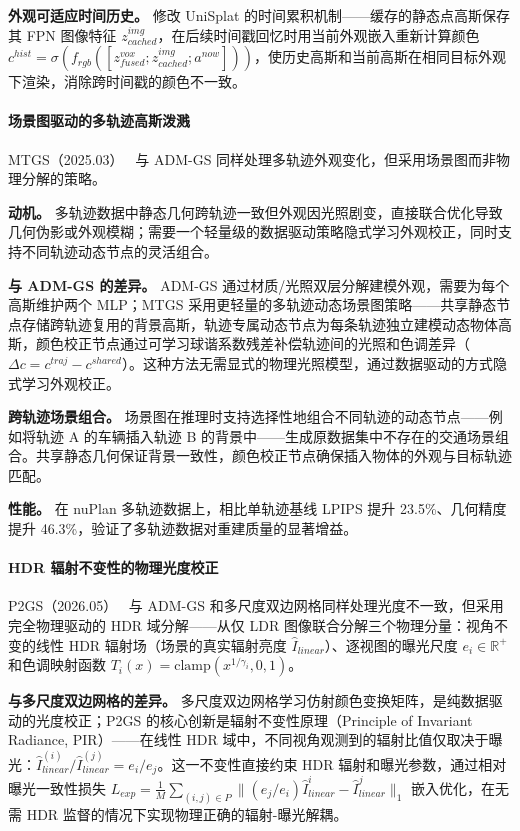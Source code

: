 \textbf{外观可适应时间历史。} 修改 UniSplat 的时间累积机制——缓存的静态点高斯保存其 FPN 图像特征 $z^{img}_{cached}$，在后续时间戳回忆时用当前外观嵌入重新计算颜色 $c^{hist} = \sigma(f_{rgb}([z^{vox}_{fused}; z^{img}_{cached}; a^{now}]))$，使历史高斯和当前高斯在相同目标外观下渲染，消除跨时间戳的颜色不一致。

\paragraph{场景图驱动的多轨迹高斯泼溅}

MTGS（2025.03）~\cite{2503_12552} 与 ADM-GS 同样处理多轨迹外观变化，但采用场景图而非物理分解的策略。

\textbf{动机。} 多轨迹数据中静态几何跨轨迹一致但外观因光照剧变，直接联合优化导致几何伪影或外观模糊；需要一个轻量级的数据驱动策略隐式学习外观校正，同时支持不同轨迹动态节点的灵活组合。

\textbf{与 ADM-GS 的差异。} ADM-GS 通过材质/光照双层分解建模外观，需要为每个高斯维护两个 MLP；MTGS 采用更轻量的多轨迹动态场景图策略——共享静态节点存储跨轨迹复用的背景高斯，轨迹专属动态节点为每条轨迹独立建模动态物体高斯，颜色校正节点通过可学习球谐系数残差补偿轨迹间的光照和色调差异（$\Delta c = c^{traj} - c^{shared}$）。这种方法无需显式的物理光照模型，通过数据驱动的方式隐式学习外观校正。

\textbf{跨轨迹场景组合。} 场景图在推理时支持选择性地组合不同轨迹的动态节点——例如将轨迹 A 的车辆插入轨迹 B 的背景中——生成原数据集中不存在的交通场景组合。共享静态几何保证背景一致性，颜色校正节点确保插入物体的外观与目标轨迹匹配。

\textbf{性能。} 在 nuPlan 多轨迹数据上，相比单轨迹基线 LPIPS 提升 23.5\%、几何精度提升 46.3\%，验证了多轨迹数据对重建质量的显著增益。

\paragraph{HDR 辐射不变性的物理光度校正}

P2GS（2026.05）~\cite{2605_16925} 与 ADM-GS 和多尺度双边网格同样处理光度不一致，但采用完全物理驱动的 HDR 域分解——从仅 LDR 图像联合分解三个物理分量：视角不变的线性 HDR 辐射场（场景的真实辐射亮度 $\hat{I}_{linear}$）、逐视图的曝光尺度 $e_i \in \mathbb{R}^+$ 和色调映射函数 $T_i(x) = \text{clamp}(x^{1/\gamma_i}, 0, 1)$。

\textbf{与多尺度双边网格的差异。} 多尺度双边网格学习仿射颜色变换矩阵，是纯数据驱动的光度校正；P2GS 的核心创新是辐射不变性原理（Principle of Invariant Radiance, PIR）——在线性 HDR 域中，不同视角观测到的辐射比值仅取决于曝光：$\hat{I}^{(i)}_{linear} / \hat{I}^{(j)}_{linear} = e_i / e_j$。这一不变性直接约束 HDR 辐射和曝光参数，通过相对曝光一致性损失 $L_{exp} = \frac{1}{M}\sum_{(i,j) \in P} \| (e_j/e_i) \hat{I}^i_{linear} - \hat{I}^j_{linear} \|_1$ 嵌入优化，在无需 HDR 监督的情况下实现物理正确的辐射-曝光解耦。

